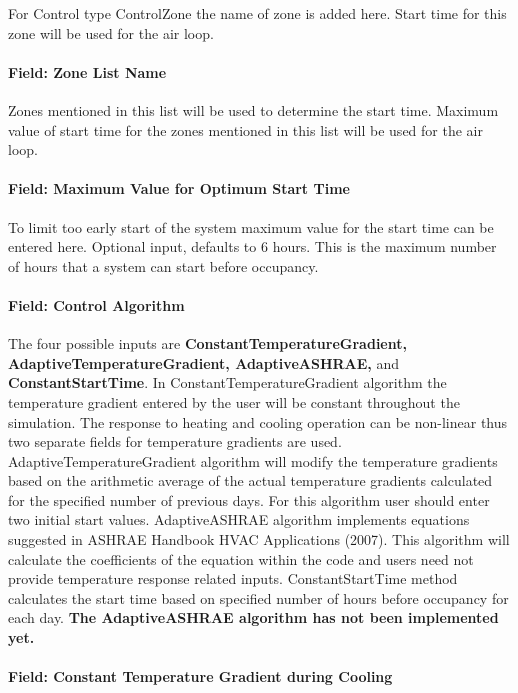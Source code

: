 For Control type ControlZone the name of zone is added here. Start time for this zone will be used for the air loop.

\paragraph{Field: Zone List Name}\label{field-zone-list-name}

Zones mentioned in this list will be used to determine the start time. Maximum value of start time for the zones mentioned in this list will be used for the air loop.

\paragraph{Field: Maximum Value for Optimum Start Time}\label{field-maximum-value-for-optimum-start-time}

To limit too early start of the system maximum value for the start time can be entered here. Optional input, defaults to 6 hours. This is the maximum number of hours that a system can start before occupancy.

\paragraph{Field: Control Algorithm}\label{field-control-algorithm}

The four possible inputs are \textbf{ConstantTemperatureGradient, AdaptiveTemperatureGradient, AdaptiveASHRAE,} and \textbf{ConstantStartTime}. In ConstantTemperatureGradient algorithm the temperature gradient entered by the user will be constant throughout the simulation. The response to heating and cooling operation can be non-linear thus two separate fields for temperature gradients are used. AdaptiveTemperatureGradient algorithm will modify the temperature gradients based on the arithmetic average of the actual temperature gradients calculated for the specified number of previous days. For this algorithm user should enter two initial start values. AdaptiveASHRAE algorithm implements equations suggested in ASHRAE Handbook HVAC Applications (2007). This algorithm will calculate the coefficients of the equation within the code and users need not provide temperature response related inputs. ConstantStartTime method calculates the start time based on specified number of hours before occupancy for each day. \textbf{The AdaptiveASHRAE algorithm has not been implemented yet.}

\paragraph{Field: Constant Temperature Gradient during Cooling}\label{field-constant-temperature-gradient-during-cooling}

